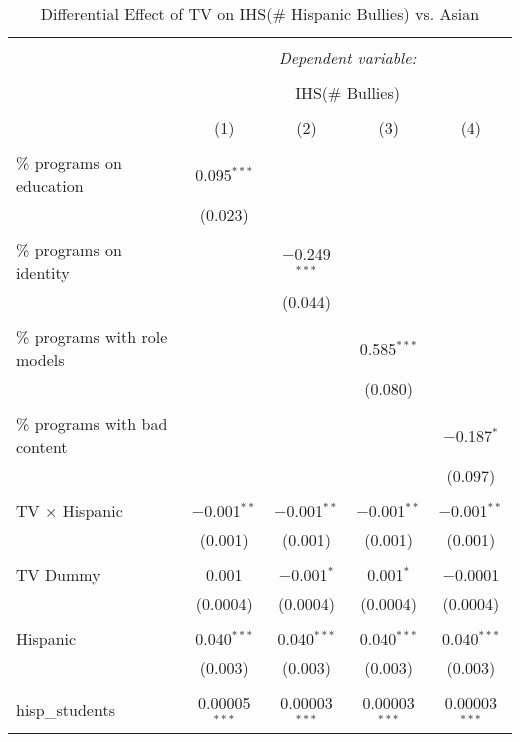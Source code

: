 
\begin{table}[!htbp] \centering 
  \caption{Differential Effect of TV on IHS(\# Hispanic Bullies) vs. Asian} 
  \label{} 
\begin{tabular}{@{\extracolsep{-2pt}}lcccc} 
\\[-1.8ex]\hline 
\hline \\[-1.8ex] 
 & \multicolumn{4}{c}{\textit{Dependent variable:}} \\ 
\cline{2-5} 
\\[-1.8ex] & \multicolumn{4}{c}{IHS(\# Bullies)} \\ 
\\[-1.8ex] & (1) & (2) & (3) & (4)\\ 
\hline \\[-1.8ex] 
 \% programs on education & 0.095$^{***}$ &  &  &  \\ 
  & (0.023) &  &  &  \\ 
  & & & & \\ 
 \% programs on identity &  & $-$0.249$^{***}$ &  &  \\ 
  &  & (0.044) &  &  \\ 
  & & & & \\ 
 \% programs with role models &  &  & 0.585$^{***}$ &  \\ 
  &  &  & (0.080) &  \\ 
  & & & & \\ 
 \% programs with bad content &  &  &  & $-$0.187$^{*}$ \\ 
  &  &  &  & (0.097) \\ 
  & & & & \\ 
 TV $\times$ Hispanic & $-$0.001$^{**}$ & $-$0.001$^{**}$ & $-$0.001$^{**}$ & $-$0.001$^{**}$ \\ 
  & (0.001) & (0.001) & (0.001) & (0.001) \\ 
  & & & & \\ 
 TV Dummy & 0.001 & $-$0.001$^{*}$ & 0.001$^{*}$ & $-$0.0001 \\ 
  & (0.0004) & (0.0004) & (0.0004) & (0.0004) \\ 
  & & & & \\ 
 Hispanic & 0.040$^{***}$ & 0.040$^{***}$ & 0.040$^{***}$ & 0.040$^{***}$ \\ 
  & (0.003) & (0.003) & (0.003) & (0.003) \\ 
  & & & & \\ 
 hisp\_students & 0.00005$^{***}$ & 0.00003$^{***}$ & 0.00003$^{***}$ & 0.00003$^{***}$ \\ 

\end{tabular}
\end{table}
